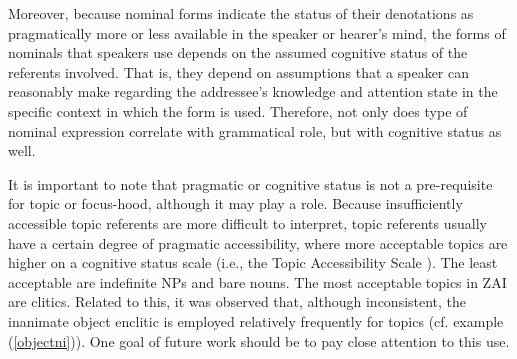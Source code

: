 Moreover, because nominal forms indicate the status of their denotations as pragmatically more or less available in the speaker or hearer's mind, the forms of nominals that speakers use depends on the assumed cognitive status of the referents involved. That is, they depend on assumptions that a speaker can reasonably make regarding the addressee's knowledge and attention state in the specific context in which the form is used. Therefore, not only does type of nominal expression correlate with grammatical role, but with cognitive status as well. 


%

It is important to note that pragmatic or cognitive status is not a pre-requisite for topic or focus-hood, although it may play a role. Because insufficiently accessible topic referents are more difficult to interpret, topic referents usually have a certain degree of pragmatic accessibility, where more acceptable topics are higher on a cognitive status scale (i.e., the Topic Accessibility Scale \citep{lambrecht1994}). The least acceptable are indefinite NPs and bare nouns. The most acceptable topics in ZAI are clitics. Related to this, it was observed that, although inconsistent, the inanimate object enclitic is employed relatively frequently for topics (cf. example (\ref{objectni})). One goal of future work should be to pay close attention to this use.

